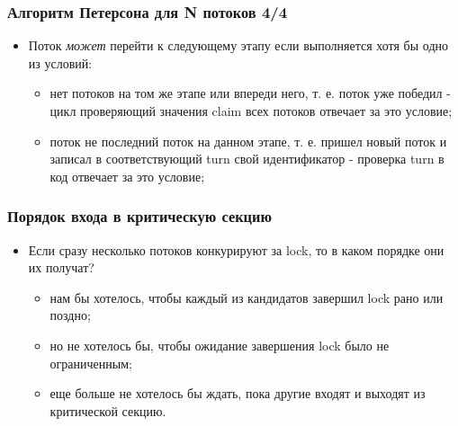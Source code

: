 \begin{frame}
\frametitle{Алгоритм Петерсона для N потоков 4/4}
\begin{itemize}
  \item Поток \emph{может} перейти к следующему этапу если выполняется хотя бы
  одно из условий:
  \begin{itemize}
    \item нет потоков на том же этапе или впереди него, т. е. поток уже
    победил - цикл проверяющий значения claim всех потоков отвечает за это
    условие;
    \item поток не последний поток на данном этапе, т. е. пришел новый поток
    и записал в соответствующий turn свой идентификатор - проверка turn в код
    отвечает за это условие;
  \end{itemize}
\end{itemize}
\end{frame}

\begin{frame}
\frametitle{Порядок входа в критическую секцию}
\begin{itemize}
  \item Если сразу несколько потоков конкурируют за lock, то в каком порядке
  они их получат?
  \begin{itemize}
    \item нам бы хотелось, чтобы каждый из кандидатов завершил lock рано или
    поздно;
    \item но не хотелось бы, чтобы ожидание завершения lock было не
    ограниченным;
    \item еще больше не хотелось бы ждать, пока другие входят и выходят из
    критической секцию.
  \end{itemize}
\end{itemize}
\end{frame}

